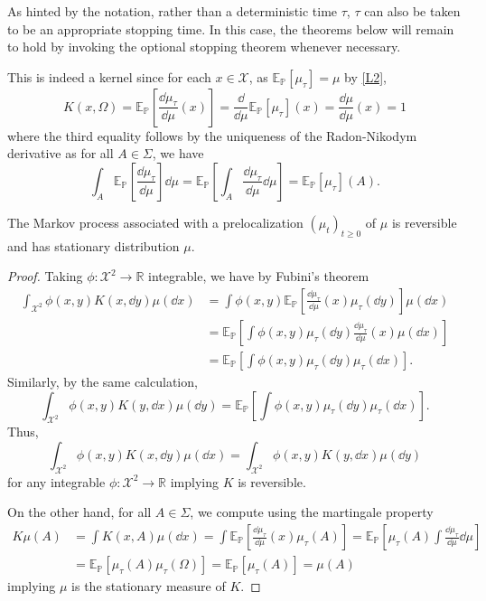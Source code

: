 As hinted by the notation, rather than a deterministic time \(\tau\), \(\tau\) can also be taken to be an 
appropriate stopping time. In this case, the theorems below will remain to hold by invoking the optional stopping 
theorem whenever necessary.

This is indeed a kernel since for each \(x \in \mathcal{X}\), as \(\mathbb{E}_\mathbb{P}[\mu_\tau] = \mu\) 
by \ref{L2},
\[K(x, \Omega) = \mathbb{E}_\mathbb{P}\left[\frac{\dd \mu_\tau}{\dd \mu}(x)\right] 
  = \frac{\dd}{\dd \mu}\mathbb{E}_\mathbb{P}[\mu_\tau](x) = \frac{\dd \mu}{\dd \mu}(x) = 1\]
where the third equality follows by the uniqueness of the Radon-Nikodym derivative as for all \(A \in \Sigma\), 
we have
\[\int_A \mathbb{E}_\mathbb{P}\left[\frac{\dd \mu_\tau}{\dd \mu}\right] \dd \mu = 
  \mathbb{E}_\mathbb{P}\left[\int_A \frac{\dd \mu_\tau}{\dd \mu} \dd \mu \right] = 
  \mathbb{E}_\mathbb{P}[\mu_\tau](A).\]

\begin{proposition}
  The Markov process associated with a prelocalization \((\mu_t)_{t \ge 0}\) of \(\mu\) is reversible and 
  has stationary distribution \(\mu\). 
\end{proposition}
\begin{proof}
  Taking \(\phi : \mathcal{X}^2 \to \mathbb{R}\) integrable, we have by Fubini's theorem
  \begin{equation}\label{eq:markov_assoc}
    \begin{split}
      \int_{\mathcal{X}^2} \phi(x, y) K(x, \dd y) \mu(\dd x) & = 
      \int \phi(x, y) \mathbb{E}_\mathbb{P}\left[\frac{\dd \mu_\tau}{\dd \mu}(x) \mu_\tau(\dd y)\right]\mu(\dd x)\\
      & = \mathbb{E}_\mathbb{P}\left[\int \phi(x, y) \mu_\tau(\dd y) \frac{\dd \mu_\tau}{\dd \mu}(x) \mu(\dd x)\right]\\
      & = \mathbb{E}_\mathbb{P}\left[\int \phi(x, y) \mu_\tau(\dd y) \mu_\tau(\dd x)\right].
    \end{split}
  \end{equation}
  Similarly, by the same calculation,   
  \[\int_{\mathcal{X}^2} \phi(x, y) K(y, \dd x) \mu(\dd y) = \mathbb{E}_\mathbb{P}\left[\int \phi(x, y) \mu_\tau(\dd y) \mu_\tau(\dd x)\right].\]
  Thus, 
  \[\int_{\mathcal{X}^2} \phi(x, y) K(x, \dd y) \mu(\dd x) = \int_{\mathcal{X}^2} \phi(x, y) K(y, \dd x) \mu(\dd y)\]
  for any integrable \(\phi : \mathcal{X}^2 \to \mathbb{R}\) implying \(K\) is reversible.

  On the other hand, for all \(A \in \Sigma\), we compute using the martingale property
  \begin{align*} 
    K\mu(A) & = \int K(x, A) \mu(\dd x) = \int \mathbb{E}_\mathbb{P}\left[\frac{\dd \mu_\tau}{\dd \mu}(x) \mu_\tau(A)\right] 
    = \mathbb{E}_\mathbb{P}\left[\mu_\tau(A) \int \frac{\dd \mu_\tau}{\dd \mu} \dd \mu\right] \\
    & = \mathbb{E}_\mathbb{P}[\mu_\tau(A) \mu_\tau(\Omega)] = \mathbb{E}_\mathbb{P}[\mu_\tau(A)] = \mu(A)
  \end{align*}
  implying \(\mu\) is the stationary measure of \(K\).
\end{proof}


